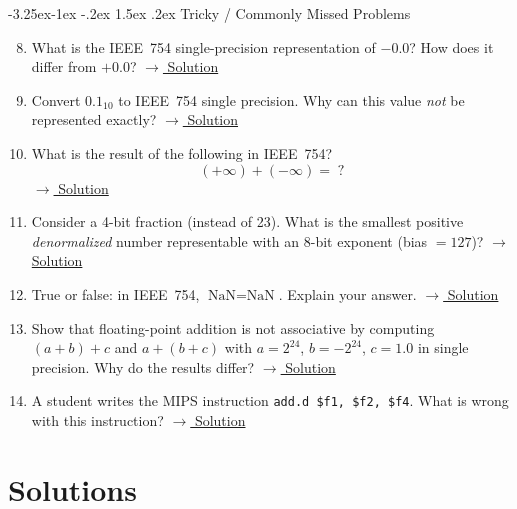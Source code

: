 \documentclass{article}
\makeatletter
\theoremstyle{remark}
\newlength{\subsecindent}
\renewcommand\subsection{\@startsection{subsection}{2}{\subsecindent}%
  {-3.25ex\@plus -1ex \@minus -.2ex}%
  {1.5ex \@plus .2ex}%
  {\normalfont\large\bfseries}}
\newenvironment{sub}{%
  \begin{list}{}{%
    \setlength{\leftmargin}{4em}%
    \setlength{\rightmargin}{0pt}%
    \setlength{\topsep}{0pt}%
    \setlength{\partopsep}{0pt}%
    \setlength{\parsep}{\parskip}%
    \setlength{\itemsep}{\parskip}%
  }\item\relax
}{\end{list}}
\makeatother
\begin{document}
\subsection{Tricky / Commonly Missed Problems}
\begin{sub}
\begin{enumerate}\setcounter{enumi}{7}
  \item What is the IEEE~754 single-precision representation of $-0.0$?
        How does it differ from $+0.0$?
        \hfill\hyperref[sol:8]{$\to$ Solution}

  \item Convert $0.1_{10}$ to IEEE~754 single precision.  Why can this value
        \emph{not} be represented exactly?
        \hfill\hyperref[sol:9]{$\to$ Solution}

  \item What is the result of the following in IEEE~754?
        \[
          (+\infty) + (-\infty) = \;?
        \]
        \hfill\hyperref[sol:10]{$\to$ Solution}

  \item Consider a 4-bit fraction (instead of 23).  What is the smallest
        positive \emph{denormalized} number representable with an 8-bit
        exponent (bias $= 127$)?
        \hfill\hyperref[sol:11]{$\to$ Solution}

  \item True or false: in IEEE~754, $\text{NaN} = \text{NaN}$.
        Explain your answer.
        \hfill\hyperref[sol:12]{$\to$ Solution}

  \item Show that floating-point addition is not associative by computing
        $(a + b) + c$ and $a + (b + c)$ with
        $a = 2^{24}$, $b = -2^{24}$, $c = 1.0$ in single precision.
        Why do the results differ?
        \hfill\hyperref[sol:13]{$\to$ Solution}

  \item A student writes the MIPS instruction
        \texttt{add.d~\$f1,~\$f2,~\$f4}.
        What is wrong with this instruction?
        \hfill\hyperref[sol:14]{$\to$ Solution}
\end{enumerate}
\end{sub}

\newpage
\section{Solutions}\label{sec:solutions}
\end{document}
